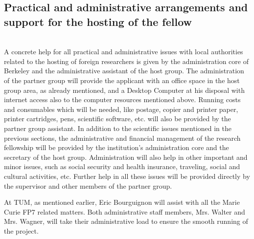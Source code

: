 \subsection{Practical and administrative arrangements and support for the hosting of the fellow 
} 
\\
A concrete help for all practical and administrative issues with local authorities related to 
the hosting of foreign researchers is given by the administration core of Berkeley and the 
administrative assistant of the host group. The administration of the partner group will 
provide the applicant with an office space in the host group area, as already mentioned, 
and a Desktop Computer at his disposal with internet access also to the computer 
resources mentioned above. Running costs and consumables which will be needed, like 
postage, copier and printer paper, printer cartridges, pens, scientific software, etc. will 
also be provided by the partner group assistant. 
In addition to the scientific issues mentioned in the previous sections, the administrative 
and financial management of the research fellowship will be provided by the institution's 
administration core and the secretary of the host group. Administration will also help in 
other important and minor issues, such as social security and health insurance, traveling, 
social and cultural activities, etc. Further help in all these issues will be provided directly 
by the supervisor and other members of the partner group.

At TUM, as mentioned earlier, Eric Bourguignon  will assist with all the
Marie Curie FP7 related matters. Both  administrative staff members, Mrs. Walter and
Mrs. Wagner, will take their administrative load  to ensure the smooth running of the
project.
\newpage
